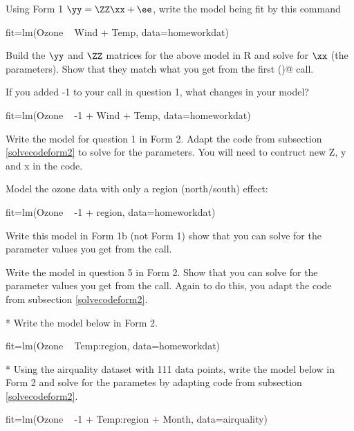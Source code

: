 \begin{hwenumerate} 

\item Using Form 1 $\yy=\ZZ\xx+\ee$, write the model being fit by this command
\begin{Schunk}
\begin{Sinput}
 fit=lm(Ozone ~ Wind + Temp, data=homeworkdat)
\end{Sinput}
\end{Schunk}

\item Build the $\yy$ and $\ZZ$ matrices for the above model in R and solve for $\xx$ (the parameters).  Show that they match what you get from the first \verb@lm()@ call.

\item If you added -1 to your \verb@lm@ call in question 1, what changes in your model?
\begin{Schunk}
\begin{Sinput}
 fit=lm(Ozone ~ -1 + Wind + Temp, data=homeworkdat)
\end{Sinput}
\end{Schunk}

\item Write the model for question 1 in Form 2. Adapt the code from subsection \ref{solvecodeform2} to solve for the parameters. You will need to contruct new Z, y and x in the code.

\item  Model the ozone data with only a region (north/south) effect:

\begin{Schunk}
\begin{Sinput}
 fit=lm(Ozone ~ -1 + region, data=homeworkdat)
\end{Sinput}
\end{Schunk}

Write this model in Form 1b (not Form 1) show that you can solve for the parameter values you get from the \verb@lm@ call.

\item Write the model in question 5 in Form 2. Show that you can solve for the parameter values you get from the \verb@lm@ call.  Again to do this, you adapt the code from subsection \ref{solvecodeform2}.

\item[\theenumi\**] Write the model below in Form 2.

\begin{Schunk}
\begin{Sinput}
 fit=lm(Ozone ~ Temp:region, data=homeworkdat)
\end{Sinput}
\end{Schunk}
\item[\theenumi\**] Using the airquality dataset with 111 data points, write the model below in Form 2 and solve for the parametes by adapting code from subsection \ref{solvecodeform2}.

\begin{Schunk}
\begin{Sinput}
 fit=lm(Ozone ~ -1 + Temp:region + Month, data=airquality)
\end{Sinput}
\end{Schunk}
\end{hwenumerate}





